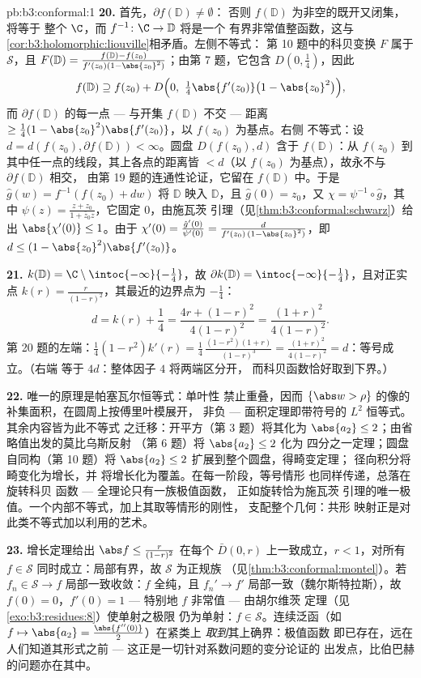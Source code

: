 \begin{solution}{pb:b3:conformal:1}
\textbf{20.} 首先，$\partial f(\mathbb D) \neq \emptyset$：
否则 $f(\mathbb D)$ 为非空的既开又闭集，将等于
整个 $\C$，而 $f^{-1} \colon \C \to \mathbb D$ 将是一个
有界非常值整函数，这与
\cref{cor:b3:holomorphic:liouville}相矛盾。左侧不等式：
第 10 题中的科贝变换 $F$ 属于 $\mathcal S$，且
$F(\mathbb D) = \frac{f(\mathbb D) -
f(z_0)}{f'(z_0)(1-\abs{z_0}^2)}$；由第 7 题，它包含
$D(0, \frac14)$，因此
\[
f(\mathbb D) \supseteq f(z_0) + D\Bigl(0,\
\tfrac14\abs{f'(z_0)}\bigl(1 - \abs{z_0}^2\bigr)\Bigr) ,
\]
而 $\partial f(\mathbb D)$ 的每一点 ---
与开集 $f(\mathbb D)$ 不交 --- 距离 $\geq
\frac14(1-\abs{z_0}^2)\abs{f'(z_0)}$，以 $f(z_0)$ 为基点。右侧
不等式：设 $d = d(f(z_0), \partial f(\mathbb D)) <
\infty$。圆盘 $D(f(z_0), d)$ 含于 $f(\mathbb D)$：从
$f(z_0)$ 到其中任一点的线段，其上各点的距离皆
$< d$（以 $f(z_0)$ 为基点），故永不与 $\partial f(\mathbb D)$ 相交，
由第 19 题的连通性论证，它留在
$f(\mathbb D)$ 中。于是 $\hat g(w) = f^{-1}(f(z_0) + dw)$ 将
$\mathbb D$ 映入 $\mathbb D$，且 $\hat g(0) = z_0$，又
$\chi = \psi^{-1}\circ\hat g$，其中 $\psi(z) = \frac{z +
z_0}{1 + \bar z_0z}$，它固定 $0$，由施瓦茨
引理（见\cref{thm:b3:conformal:schwarz}）给出 $\abs{\chi'(0)}
\leq 1$。由于 $\chi'(0) = \frac{\hat g'(0)}{\psi'(0)} =
\frac{d}{f'(z_0)\,(1 - \abs{z_0}^2)}$，即 $d \leq (1 -
\abs{z_0}^2)\abs{f'(z_0)}$。

\textbf{21.} $k(\mathbb D) = \C\setminus
\intoc{-\infty}{-\frac14}$，故 $\partial k(\mathbb D) =
\intoc{-\infty}{-\frac14}$，且对正实点
$k(r) = \frac r{(1-r)^2}$，其最近的边界点为
$-\frac14$：
\[
d = k(r) + \frac14 = \frac{4r + (1-r)^2}{4(1-r)^2}
= \frac{(1+r)^2}{4(1-r)^2} .
\]
第 20 题的左端：$\frac14(1 - r^2)k'(r) =
\frac14\,\frac{(1-r^2)(1+r)}{(1-r)^3} =
\frac{(1+r)^2}{4(1-r)^2} = d$：等号成立。（右端
等于 $4d$：整体因子 $4$ 将两端区分开，
而科贝函数恰好取到下界。）

\textbf{22.} 唯一的原理是帕塞瓦尔恒等式：单叶性
禁止重叠，因而
$\{\abs w > \rho\}$ 的像的补集面积，在圆周上按傅里叶模展开，
非负 --- 面积定理即带符号的 $L^2$
恒等式。其余内容皆为此不等式
之迁移：开平方（第 3 题）将其化为
$\abs{a_2} \leq 2$；由省略值出发的莫比乌斯反射
（第 6 题）将 $\abs{a_2} \leq 2$ 化为
四分之一定理；圆盘自同构（第 10 题）将 $\abs{a_2}
\leq 2$ 扩展到整个圆盘，得畸变定理；
径向积分将畸变化为增长，并
将增长化为覆盖。在每一阶段，等号情形
也同样传递，总落在旋转科贝
函数 --- 全理论只有一族极值函数，
正如旋转恰为施瓦茨
引理的唯一极值。一个内部不等式，加上其取等情形的刚性，
支配整个几何：共形
映射正是对此类不等式加以利用的艺术。

\textbf{23.} 增长定理给出 $\abs f \leq
\frac{r}{(1-r)^2}$ 在每个 $\bar D(0, r)$ 上一致成立，$r <
1$，对所有 $f \in \mathcal S$ 同时成立：局部有界，故
$\mathcal S$ 为正规族
（见\cref{thm:b3:conformal:montel}）。若 $f_n \in \mathcal S \to
f$ 局部一致收敛：$f$ 全纯，且 $f_n' \to f'$
局部一致（魏尔斯特拉斯），故 $f(0) = 0$，$f'(0) = 1$
--- 特别地 $f$ 非常值 --- 由胡尔维茨
定理（见\cref{exo:b3:residues:8}）使单射之极限
仍为单射：$f \in \mathcal S$。连续泛函（如
$f \mapsto \abs{a_2} = \frac{\abs{f''(0)}}2$）在紧类上
\emph{取到}其上确界：极值函数
即已存在，远在人们知道其形式之前 ---
这正是一切针对系数问题的变分论证的
出发点，比伯巴赫的问题亦在其中。


\end{solution}
